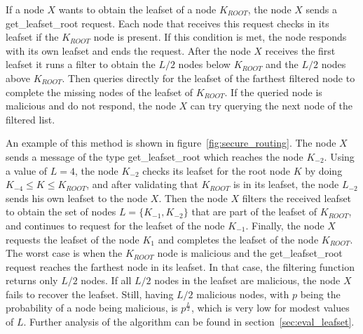 If a node $X$ wants to obtain the leafset of a node $K_{ROOT}$, the node $X$ sends a get\_leafset\_root request.
Each node that receives this request checks in its leafset if the $K_{ROOT}$
node is present. If this condition is met, the node responds with its own
leafset and ends the request.
After the node $X$ receives the first leafset it runs a filter to obtain the
$L/2$ nodes  below $K_{ROOT}$ and the $L/2$ nodes above $K_{ROOT}$. Then
queries directly for the leafset of the farthest filtered node to complete
the missing nodes of the leafset of $K_{ROOT}$.  If the queried node is
malicious and do not respond,  the node $X$ can try querying the next node of
the filtered list.

An example of this method is shown in figure~\ref{fig:secure_routing}. The node $X$
sends a message of the type get\_leafset\_root which reaches the node $K_{-2}$.
Using a value of $L = 4$, the node $K_{-2}$ checks its leafset for the root
node $K$ by doing $K_{-4} \le K \le K_{ROOT}$, and after validating that $K_{ROOT}$
is in its leafset, the node $L_{-2}$ sends his own leafset to the node $X$.
Then the node $X$ filters the received leafset to obtain the set of nodes 
$L = \{K_{-1}, K_{-2}\}$ that are part of the leafset of $K_{ROOT}$,  and
continues to request for the leafset of the node $K_{-1}$. Finally, the node $X$
requests the leafset of the node $K_{1}$ and completes the leafset of the node
$K_{ROOT}$. The worst case is when the $K_{ROOT}$ node is malicious and the
get\_leafset\_root request reaches the farthest node in its leafset. In that
case, the filtering function returns only $L/2$ nodes. If all $L/2$ nodes in the
leafset are malicious, the node $X$ fails to recover the leafset. Still, having $L/2$
malicious nodes, with $p$ being the probability of a node being malicious, is
$p^{\frac{L}{2}}$, which is very low for modest values of $L$. Further
analysis of the algorithm can be found in section~\ref{sec:eval_leafset}.


